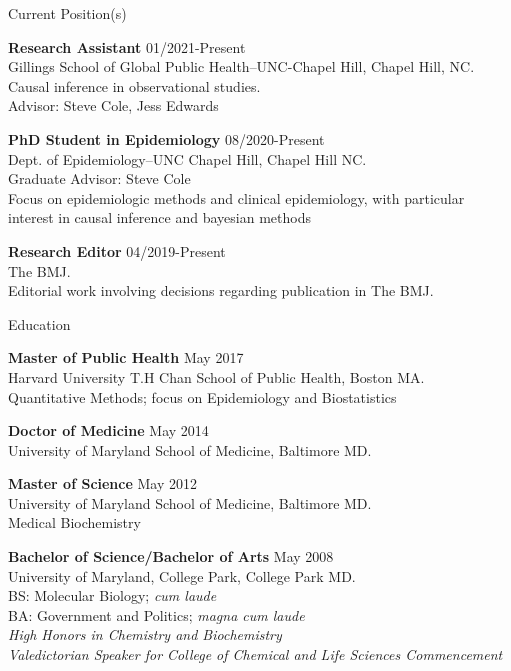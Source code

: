 \documentclass{resume} %
\begin{document}
\begin{rSection}{Current Position(s)}

{\bf Research Assistant} \hfill {01/2021-Present}
\\ 
Gillings School of Global Public Health--UNC-Chapel Hill, Chapel Hill, NC. 
\\
Causal inference in observational studies.\\
Advisor: Steve Cole, Jess Edwards

{\bf PhD Student in Epidemiology} \hfill {08/2020-Present}
\\ 
Dept. of Epidemiology--UNC Chapel Hill, Chapel Hill NC. 
\\
Graduate Advisor: Steve Cole\\
Focus on epidemiologic methods and clinical epidemiology, with particular interest in causal inference and bayesian methods

{\bf Research Editor } \hfill {04/2019-Present}
\\ 
The BMJ. 
\\
Editorial work involving decisions regarding publication in The BMJ. 

\end{rSection}

\begin{rSection}{Education}

{\bf Master of Public Health} \hfill {May 2017}
\\ 
Harvard University T.H Chan School of Public Health, Boston MA. 
\\
Quantitative Methods; focus on Epidemiology and Biostatistics  

{\bf Doctor of Medicine} \hfill {May 2014}
\\ 
University of Maryland School of Medicine, Baltimore MD.

{\bf Master of Science} \hfill {May 2012}
\\ 
University of Maryland School of Medicine, Baltimore MD.
\\
Medical Biochemistry

{\bf Bachelor of Science/Bachelor of Arts} \hfill {May 2008}
\\ 
University of Maryland, College Park, College Park MD.
\\
BS: Molecular Biology; \textit{cum laude}\\
BA: Government and Politics; \textit{magna cum laude}\\
\textit{High Honors in Chemistry and Biochemistry}\\
\textit{Valedictorian Speaker for College of Chemical and Life Sciences Commencement}

\end{rSection}
\pagebreak
\end{document}
